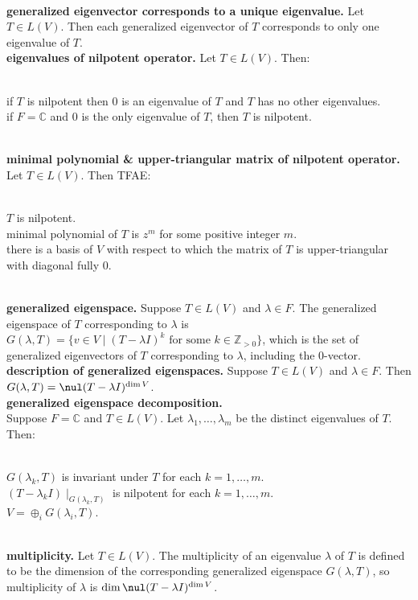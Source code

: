 	\\ \textbf{generalized eigenvector corresponds to a unique eigenvalue. } Let $T \in L(V)$. Then each generalized eigenvector of $T$ corresponds to only one eigenvalue of $T$. 
	\\ \textbf{eigenvalues of nilpotent operator. } Let $T \in L(V)$. Then: 
	\begin{enumerate}
		\\ if $T$ is nilpotent then 0 is an eigenvalue of $T$ and $T$ has no other eigenvalues. 
		\\ if $F = \mathbb{C}$ and 0 is the only eigenvalue of $T$, then $T$ is nilpotent. 
	\end{enumerate}
	\\ \textbf{minimal polynomial \& upper-triangular matrix of nilpotent operator. } Let $T \in L(V)$. Then TFAE: 
	\begin{enumerate}
		\\ $T$ is nilpotent. 
		\\ minimal polynomial of $T$ is $z^m$ for some positive integer $m$. 
		\\ there is a basis of $V$ with respect to which the matrix of $T$ is upper-triangular with diagonal fully 0. 
	\end{enumerate}
	\\ \textbf{generalized eigenspace. } Suppose $T \in L(V)$ and $\lambda \in F$. The generalized eigenspace of $T$ corresponding to $\lambda$ is $G(\lambda, T) = \{v \in V \mid (T - \lambda I)^k \textrm{ for some } k \in \mathbb{Z}_{>0}\}$, which is the set of generalized eigenvectors of $T$ corresponding to $\lambda$, including the 0-vector. 
	\\ \textbf{description of generalized eigenspaces. } Suppose $T \in L(V)$ and $\lambda \in F$. Then $G(\lambda, T) = \nul(T - \lambda I)^{\dim V}$. 
	\\ \textbf{generalized eigenspace decomposition. } 
	\\ Suppose $F = \mathbb{C}$ and $T \in L(V)$. Let $\lambda_1,\dots,\lambda_m$ be the distinct eigenvalues of $T$. Then: 
	\begin{enumerate}
		\\ $G(\lambda_k,T)$ is invariant under $T$ for each $k=1,\dots,m$. 
		\\ $(T - \lambda_k I) \mid_{G(\lambda_k, T)}$ is nilpotent for each $k=1,\dots,m$. 
		\\ $V = \oplus_i G(\lambda_i, T)$. 
	\end{enumerate}
	\\ \textbf{multiplicity. } Let $T \in L(V)$. The multiplicity of an eigenvalue $\lambda$ of $T$ is defined to be the dimension of the corresponding generalized eigenspace $G(\lambda, T)$, so multiplicity of $\lambda$ is $\dim \nul(T - \lambda I)^{\dim V}$. 
